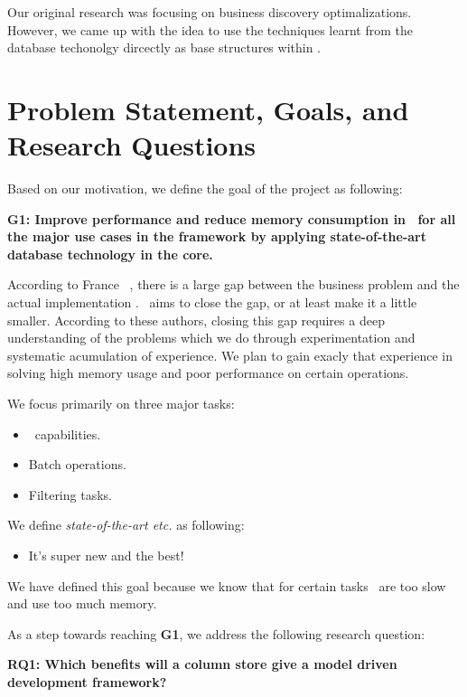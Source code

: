 
Our original research was focusing on business discovery optimalizations. However, we came up with the idea to use the techniques learnt from the database techonolgy dircectly as base structures within \gap.

\section{Problem Statement, Goals, and Research Questions}
\label{sec:Problem Statement, Goals, and Research Questions}
Based on our motivation, we define the goal of the project as following: 

\textbf{G1: Improve performance and reduce memory consumption in \gap~for all the major use cases in the framework by applying state-of-the-art database technology in the core.}

According to France \ea~, there is a large gap between the business problem and the actual implementation \cite{France2007-ae}. \mdd~aims to close the gap, or at least make it a little smaller. According to these authors, closing this gap requires a deep understanding of the problems which we do through experimentation and systematic acumulation of experience. We plan to gain exacly that experience in solving high memory usage and poor performance on certain operations. 

We focus primarily on three major tasks:
\begin{itemize}
    \item \bd~capabilities.
    \item Batch operations.
    \item Filtering tasks.
\end{itemize}

We define \textit{state-of-the-art etc.} as following:
\begin{itemize}
    \item It's super new and the best!
\end{itemize}

We have defined this goal because we know that for certain tasks \gap~are too slow and use too much memory.

As a step towards reaching \textbf{G1}, we address the following research question:

\textbf{RQ1: Which benefits will a column store give a model driven development framework?} 

